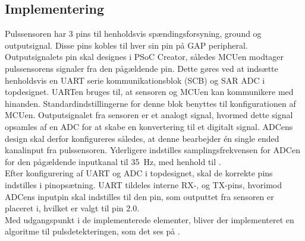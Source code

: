 \subsection{Implementering} \label{puls_impl}
Pulssensoren har 3 pins til henholdsvis spændingsforsyning, ground og outputsignal. Disse pins kobles til hver sin pin på GAP peripheral. Outputsignalets pin skal designes i PSoC Creator, således MCUen modtager pulssensorens signaler fra den pågældende pin. Dette gøres ved at indsætte henholdsvis en UART serie kommunikationsblok (SCB) og SAR ADC i topdesignet. UARTen bruges til, at sensoren og MCUen kan kommunikere med hinanden. Standardindstillingerne for denne blok benyttes til konfigurationen af MCUen. \newline
Outputsignalet fra sensoren er et analogt signal, hvormed dette signal opsamles af en ADC for at skabe en konvertering til et digitalt signal. ADCens design skal derfor konfigureres således, at denne bearbejder én single ended kanalinput fra pulssensoren. Yderligere indstilles samplingsfrekvensen for ADCen for den pågældende inputkanal til 35~Hz, med henhold til . \\
Efter konfigurering af UART og ADC i topdesignet, skal de korrekte pins indstilles i pinopsætning. UART tildeles interne RX-, og TX-pins, hvorimod ADCens inputpin skal indstilles til den pin, som outputtet fra sensoren er placeret i, hvilket er valgt til pin 2.0. \\
Med udgangspunkt i de implementerede elementer, bliver der implementeret en algoritme til pulsdetekteringen, som det ses på .
